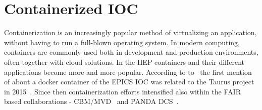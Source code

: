 \section{Containerized IOC}
Containerization is an increasingly popular method of virtualizing an application, without having to run a full-blown operating system. In modern computing, containers are commonly used both in development and production environments, often together with cloud solutions. In the \gls{HEP} containers and their different applications become more and more popular. According to to~\cite{Klaus2021} the first mention of about a docker container of the \gls{EPICS} \gls{IOC} was related to the Taurus project in 2015~\cite{taurus}. Since then containerization efforts intensified also within the \gls{FAIR} based collaborations - \gls{CBM}/\gls{MVD}~\cite{Klaus2021} and PANDA DCS~\cite{PANDA_1}.

